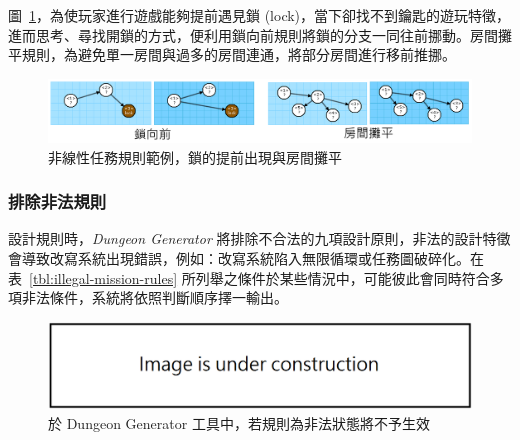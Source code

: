 圖~\ref{fig:missiongrammars-rules-nonlinear-example3}，為使玩家進行遊戲能夠提前遇見鎖 (lock)，當下卻找不到鑰匙的遊玩特徵，進而思考、尋找開鎖的方式，便利用鎖向前規則將鎖的分支一同往前挪動。房間攤平規則，為避免單一房間與過多的房間連通，將部分房間進行移前推挪。
 
\begin{figure}[ht]
  \begin{center}
    \includegraphics[width=1.0\textwidth]{figures/missiongrammars-rules-nonlinear-example3.png}
    \caption{非線性任務規則範例，鎖的提前出現與房間攤平}
    \label{fig:missiongrammars-rules-nonlinear-example3}
  \end{center}
\end{figure}



\subsubsection{排除非法規則}
\label{sssec:method-missiongrammars-rules-illegals}

設計規則時，\textit{Dungeon Generator} 將排除不合法的九項設計原則，非法的設計特徵會導致改寫系統出現錯誤，例如：改寫系統陷入無限循環或任務圖破碎化。在表~\ref{tbl:illegal-mission-rules} 所列舉之條件於某些情況中，可能彼此會同時符合多項非法條件，系統將依照判斷順序擇一輸出。

\begin{figure}[ht]
  \begin{center}
    \includegraphics[width=1.0\textwidth]{figures/under_construction.png}
    \caption{於 Dungeon Generator 工具中，若規則為非法狀態將不予生效}
    \label{fig:missiongrammars-illegal-rules}
  \end{center}
\end{figure}

